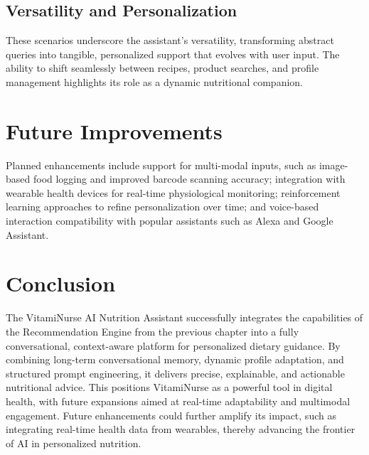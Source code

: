 \subsection{Versatility and Personalization}
These scenarios underscore the assistant's versatility, transforming abstract queries into tangible, personalized support that evolves with user input. The ability to shift seamlessly between recipes, product searches, and profile management highlights its role as a dynamic nutritional companion.


\section{Future Improvements}
Planned enhancements include support for multi-modal inputs, such as image-based food logging and improved barcode scanning accuracy; integration with wearable health devices for real-time physiological monitoring; reinforcement learning approaches to refine personalization over time; and voice-based interaction compatibility with popular assistants such as Alexa and Google Assistant.

\section{Conclusion}
The VitamiNurse AI Nutrition Assistant successfully integrates the capabilities of the Recommendation Engine from the previous chapter into a fully conversational, context-aware platform for personalized dietary guidance. By combining long-term conversational memory, dynamic profile adaptation, and structured prompt engineering, it delivers precise, explainable, and actionable nutritional advice. This positions VitamiNurse as a powerful tool in digital health, with future expansions aimed at real-time adaptability and multimodal engagement. Future enhancements could further amplify its impact, such as integrating real-time health data from wearables, thereby advancing the frontier of AI in personalized nutrition.
